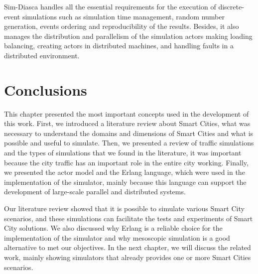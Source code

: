 Sim-Diasca handles all the essential requirements for the execution of discrete-event simulations such as simulation time management, random number generation, events ordering and reproducibility of the results. Besides, it also manages the distribution and parallelism of the simulation actors making loading balancing, creating actors in distributed machines, and handling faults in a distributed environment.

\section{Conclusions}
\label{sec:rev_conclusoes}

This chapter presented the most important concepts used in the development of this work. First, we introduced a literature review about Smart Cities, what was necessary to understand the domains and dimensions of Smart Cities and what is possible and useful to simulate. Then, we presented a review of traffic simulations and the types of simulations that we found in the literature, it was important because the city traffic has an important role in the entire city working. Finally, we presented the actor model and the Erlang language, which were used in the implementation of the simulator, mainly because this language can support the development of large-scale parallel and distributed systems.

Our literature review showed that it is possible to simulate various Smart City scenarios, and these simulations can facilitate the tests and experiments of Smart City solutions. We also discussed why Erlang is a reliable choice for the implementation of the simulator and why mesoscopic simulation is a good alternative to met our objectives. In the next chapter, we will discuss the related work, mainly showing simulators that already provides one or more Smart Cities scenarios.
